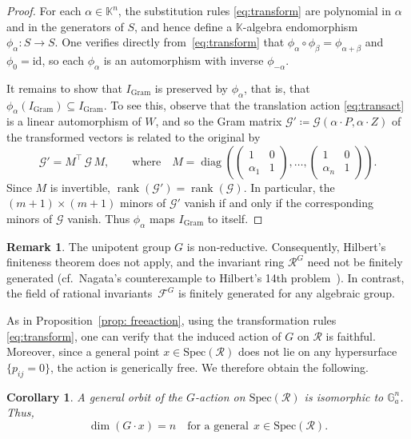 \documentclass[12pt,a4paper]{extarticle}
\newtheorem{corollary}[theorem]{Corollary}
\theoremstyle{definition}
\newtheorem{remark}[theorem]{Remark}
\newcommand{\K}{\mathbb{K}}
\begin{document}
\begin{proof}
For each $\alpha \in \K^n$, the substitution rules \eqref{eq:transform} are polynomial in $\alpha$ and in the generators of $S$, and hence define a $\K$-algebra endomorphism $\phi_\alpha\colon S \to S$. One verifies directly from~\eqref{eq:transform} that $\phi_\alpha \circ \phi_\beta = \phi_{\alpha + \beta}$ and $\phi_0 = \mathrm{id}$, so each $\phi_\alpha$ is an automorphism with inverse $\phi_{-\alpha}$.

\smallskip

It remains to show that $I_{\mathrm{Gram}}$ is preserved by $\phi_\alpha$, that is, that $\phi_\alpha(I_{\mathrm{Gram}}) \subseteq I_{\mathrm{Gram}}$. To see this, observe that the translation action \eqref{eq:transact} is a linear automorphism of $W$, and so the Gram matrix $\mathcal{G}' \coloneqq \mathcal{G}(\alpha \cdot P, \alpha \cdot Z)$ of the transformed vectors is related to the original by
$$
\mathcal{G}' = M^\top\, \mathcal{G}\, M, \qquad \text{where} \quad
M = \operatorname{diag}\!\left(
\begin{pmatrix} 1 & 0 \\ \alpha_1 & 1 \end{pmatrix},
\ldots,
\begin{pmatrix} 1 & 0 \\ \alpha_n & 1 \end{pmatrix}
\right).
$$
Since $M$ is invertible, $\operatorname{rank}(\mathcal{G}') = \operatorname{rank}(\mathcal{G})$. In particular, the $(m{+}1) \times (m{+}1)$ minors of $\mathcal{G}'$ vanish if and only if the corresponding minors of $\mathcal{G}$ vanish. Thus $\phi_\alpha$ maps $I_{\mathrm{Gram}}$ to itself.
\end{proof}
\begin{remark}
The unipotent group $G$ is non‑reductive. Consequently, Hilbert’s finiteness
theorem does not apply, and the invariant ring $\mathcal{R}^{G}$ need not be
finitely generated (cf.~Nagata’s counterexample to Hilbert’s 14th
problem~\cite{Nagata1959}). In contrast, the field of rational invariants~$\mathcal{F}^{G}$ is finitely generated for any algebraic group.
\end{remark}
As in Proposition~\ref{prop: freeaction},  using the
transformation rules \eqref{eq:transform}, one can verify that the induced action
of $G$ on $\mathcal{R}$ is faithful. Moreover, since a general point
$x\in\mathrm{Spec}(\mathcal{R})$ does not lie on any hypersurface
$\{p_{ij}=0\}$, the action is generically free. We therefore obtain the
following.
\begin{corollary}\label{cor: GenOrbit}
    A general orbit of the $G$-action on $\mathrm{Spec}(\mathcal{R})$ is isomorphic to $\mathbb{G}_a^n$. Thus, 
    $$\dim (G \cdot x) = n \quad \text{for a general}  \;\, x \in \mathrm{Spec}(\mathcal{R}).$$
\end{corollary}
\end{document}
